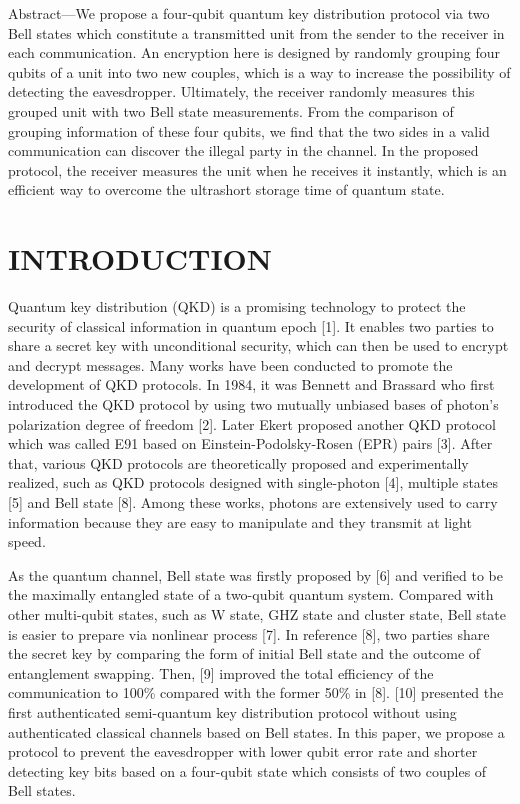 \documentclass[a4paper,11pt]{article}
\begin{document}
Abstract—We propose a four-qubit quantum key distribution protocol via two Bell states which constitute a transmitted unit from the sender to the receiver in each communication. An encryption here is designed by randomly grouping four qubits of a unit into two new couples, which is a way to increase
the possibility of detecting the eavesdropper. Ultimately, the receiver randomly measures this grouped unit with two Bell state measurements. From the comparison of grouping information of these four qubits, we find that the two sides in a valid communication can discover the illegal party in the channel. In the proposed protocol, the receiver measures the unit when he receives it instantly, which is an efficient way to overcome the ultrashort storage time of quantum state.


\section{INTRODUCTION}

Quantum key distribution (QKD) is a promising technology to protect the security of classical information in quantum epoch [1]. It enables two parties to share a secret key with unconditional security, which can then be used to encrypt and decrypt messages. Many works have been conducted to promote the development of QKD protocols. In 1984, it was Bennett and Brassard who first introduced the QKD protocol by using two mutually unbiased bases of photon’s polarization degree of freedom [2]. Later Ekert proposed another QKD protocol which was called E91 based on Einstein-Podolsky-Rosen (EPR) pairs [3]. After that, various QKD protocols are theoretically proposed and experimentally realized, such as QKD protocols designed with single-photon [4], multiple states [5] and Bell state [8]. Among these works, photons are extensively used to carry information because they are easy to manipulate and they transmit at light speed.

As the quantum channel, Bell state was firstly proposed by [6] and verified to be the maximally entangled state of a two-qubit quantum system. Compared with other multi-qubit states, such as W state, GHZ state and cluster state, Bell state is easier to prepare via nonlinear process [7]. In reference [8], two parties share the secret key by comparing the form of initial Bell state and the outcome of entanglement swapping. Then, [9] improved the total efficiency of the communication to 100\% compared with the former 50\% in [8]. [10] presented the first authenticated semi-quantum key distribution protocol
without using authenticated classical channels based on Bell states. In this paper, we propose a protocol to prevent the eavesdropper with lower qubit error rate and shorter detecting key bits based on a four-qubit state which consists of two couples of Bell states.
\end{document}
